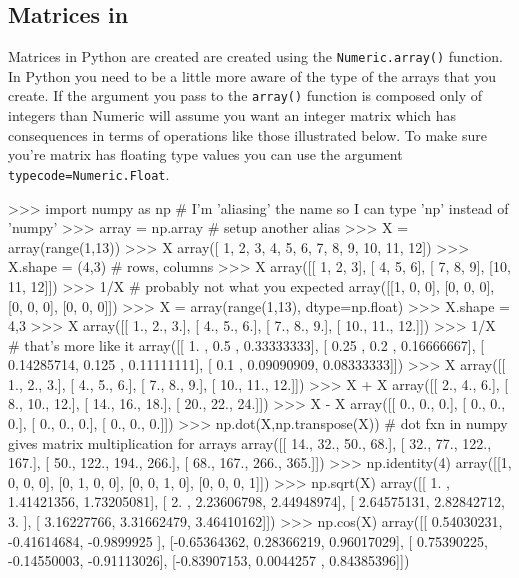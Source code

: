 \subsection{Matrices in \numpy}

Matrices in Python are created are created using the
\lstinline!Numeric.array()! function. In Python you need to be a little
more aware of the type of the arrays that you create. If the argument
you pass to the \lstinline!array()! function is composed only of
integers than Numeric will assume you want an integer matrix which has
consequences in terms of operations like those illustrated below. To
make sure you're matrix has floating type values you can use the
argument \lstinline!typecode=Numeric.Float!.

\begin{python}
>>> import numpy as np # I'm 'aliasing' the name so I can type 'np' instead of 'numpy'
>>> array = np.array # setup another alias
>>> X = array(range(1,13))
>>> X
array([ 1,  2,  3,  4,  5,  6,  7,  8,  9, 10, 11, 12])
>>> X.shape = (4,3) # rows, columns
>>> X
array([[ 1,  2,  3],
       [ 4,  5,  6],
       [ 7,  8,  9],
       [10, 11, 12]])
>>> 1/X # probably not what you expected
array([[1, 0, 0],
       [0, 0, 0],
       [0, 0, 0],
       [0, 0, 0]])
>>> X = array(range(1,13), dtype=np.float)
>>> X.shape = 4,3
>>> X
array([[  1.,   2.,   3.],
       [  4.,   5.,   6.],
       [  7.,   8.,   9.],
       [ 10.,  11.,  12.]])
>>> 1/X # that's more like it
array([[ 1.        ,  0.5       ,  0.33333333],
       [ 0.25      ,  0.2       ,  0.16666667],
       [ 0.14285714,  0.125     ,  0.11111111],
       [ 0.1       ,  0.09090909,  0.08333333]])
>>> X
array([[  1.,   2.,   3.],
       [  4.,   5.,   6.],
       [  7.,   8.,   9.],
       [ 10.,  11.,  12.]])
>>> X + X
array([[  2.,   4.,   6.],
       [  8.,  10.,  12.],
       [ 14.,  16.,  18.],
       [ 20.,  22.,  24.]])
>>> X - X
array([[ 0.,  0.,  0.],
       [ 0.,  0.,  0.],
       [ 0.,  0.,  0.],
       [ 0.,  0.,  0.]])
>>> np.dot(X,np.transpose(X)) # dot fxn in numpy gives matrix multiplication for arrays
array([[  14.,   32.,   50.,   68.],
       [  32.,   77.,  122.,  167.],
       [  50.,  122.,  194.,  266.],
       [  68.,  167.,  266.,  365.]])
>>> np.identity(4)
array([[1, 0, 0, 0],
       [0, 1, 0, 0],
       [0, 0, 1, 0],
       [0, 0, 0, 1]])
>>> np.sqrt(X)
array([[ 1.        ,  1.41421356,  1.73205081],
       [ 2.        ,  2.23606798,  2.44948974],
       [ 2.64575131,  2.82842712,  3.        ],
       [ 3.16227766,  3.31662479,  3.46410162]])
>>> np.cos(X)
array([[ 0.54030231, -0.41614684, -0.9899925 ],
       [-0.65364362,  0.28366219,  0.96017029],
       [ 0.75390225, -0.14550003, -0.91113026],
       [-0.83907153,  0.0044257 ,  0.84385396]])
\end{python}

